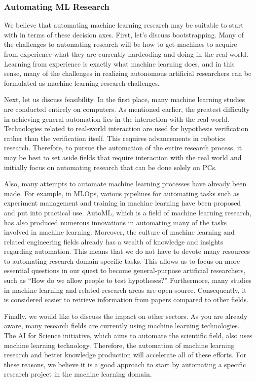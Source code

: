 \subsubsection{Automating ML Research}
We believe that automating machine learning research may be suitable to start with in terms of these decision axes. First, let's discuss bootstrapping. Many of the challenges to automating research will be how to get machines to acquire from experience what they are currently hardcoding and doing in the real world. Learning from experience is exactly what machine learning does, and in this sense, many of the challenges in realizing autonomous artificial researchers can be formulated as machine learning research challenges.

Next, let us discuss feasibility. In the first place, many machine learning studies are conducted entirely on computers. As mentioned earlier, the greatest difficulty in achieving general automation lies in the interaction with the real world. Technologies related to real-world interaction are used for hypothesis verification rather than the verification itself. This requires advancements in robotics research. Therefore, to pursue the automation of the entire research process, it may be best to set aside fields that require interaction with the real world and initially focus on automating research that can be done solely on PCs. 

Also, many attempts to automate machine learning processes have already been made. For example, in MLOps, various pipelines for automating tasks such as experiment management and training in machine learning have been proposed and put into practical use. AutoML, which is a field of machine learning research, has also produced numerous innovations in automating many of the tasks involved in machine learning. Moreover, the culture of machine learning and related engineering fields already has a wealth of knowledge and insights regarding automation. This means that we do not have to devote many resources to automating research domain-specific tasks. This allows us to focus on more essential questions in our quest to become general-purpose artificial researchers, such as ``How do we allow people to test hypotheses?'' Furthermore, many studies in machine learning and related research areas are open-source. Consequently, it is considered easier to retrieve information from papers compared to other fields. 

Finally, we would like to discuss the impact on other sectors. As you are already aware, many research fields are currently using machine learning technologies. The AI for Science initiative, which aims to automate the scientific field, also uses machine learning technology. Therefore, the automation of machine learning research and better knowledge production will accelerate all of these efforts. For these reasons, we believe it is a good approach to start by automating a specific research project in the machine learning domain.

